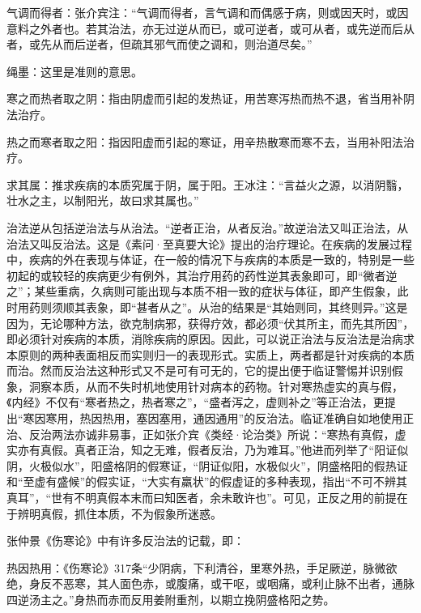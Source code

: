 \documentclass[draft,12pt]{ctexbook}
\begin{document}
\begin{jiaozhu}
	\item 气调而得者：张介宾注：“气调而得者，言气调和而偶感于病，则或因天时，或因意料之外者也。若其治法，亦无过逆从而已，或可逆者，或可从者，或先逆而后从者，或先从而后逆者，但疏其邪气而使之调和，则治道尽矣。”
	\item 绳墨：这里是准则的意思。
	\item 寒之而热者取之阴：指由阴虚而引起的发热证，用苦寒泻热而热不退，省当用补阴法治疗。
	\item 热之而寒者取之阳：指因阳虚而引起的寒证，用辛热散寒而寒不去，当用补阳法治疗。
	\item 求其属：推求疾病的本质究属于阴，属于阳。王冰注：“言益火之源，以消阴翳，壮水之主，以制阳光，故曰求其属也。”
\end{jiaozhu}



治法逆从包括逆治法与从治法。“逆者正治，从者反治。”故逆治法又叫正治法，从治法又叫反治法。这是《素问·至真要大论》提出的治疗理论。在疾病的发展过程中，疾病的外在表现与体证，在一般的情况下与疾病的本质是一致的，特别是一些初起的或较轻的疾病更少有例外，其治疗用药的药性逆其表象即可，即“微者逆之”；某些重病，久病则可能出现与本质不相一致的症状与体征，即产生假象，此时用药则须顺其表象，即“甚者从之”。从治的结果是“其始则同，其终则异。”这是因为，无论哪种方法，欲克制病邪，获得疗效，都必须“伏其所主，而先其所因”，即必须针对疾病的本质，消除疾病的原因。因此，可以说正治法与反治法是治病求本原则的两种表面相反而实则归一的表现形式。实质上，两者都是针对疾病的本质而治。然而反治法这种形式又不是可有可无的，它的提出便于临证警惕并识别假象，洞察本质，从而不失时机地使用针对病本的药物。针对寒热虚实的真与假，《内经》不仅有“寒者热之，热者寒之”，“盛者泻之，虚则补之”等正治法，更提出“寒因寒用，热因热用，塞因塞用，通因通用”的反治法。临证准确自如地使用正治、反治两法亦诚非易事，正如张介宾《类经·论治类》所说：“寒热有真假，虚实亦有真假。真者正治，知之无难，假者反治，乃为难耳。”他进而列举了“阳证似阴，火极似水”，阳盛格阴的假寒证，“阴证似阳，水极似火”，阴盛格阳的假热证和“至虚有盛候”的假实证，“大实有羸状”的假虚证的多种表现，指出“不可不辨其真耳”，“世有不明真假本末而曰知医者，余未敢许也”。可见，正反之用的前提在于辨明真假，抓住本质，不为假象所迷惑。



张仲景《伤寒论》中有许多反治法的记载，即：

热因热用：《伤寒论》317条“少阴病，下利清谷，里寒外热，手足厥逆，脉微欲绝，身反不恶寒，其人面色赤，或腹痛，或干呕，或咽痛，或利止脉不出者，通脉四逆汤主之。”身热而赤而反用姜附重剂，以期立挽阴盛格阳之势。
\end{document}
